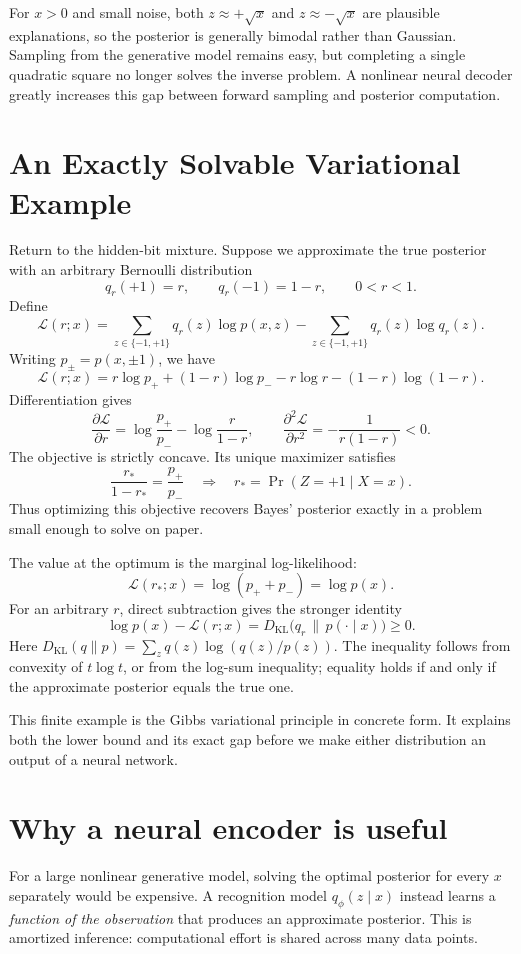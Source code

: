 For \(x>0\) and small noise, both \(z\approx+\sqrt x\) and \(z\approx-\sqrt x\) are plausible explanations, so the posterior is generally bimodal rather than Gaussian. Sampling from the generative model remains easy, but completing a single quadratic square no longer solves the inverse problem. A nonlinear neural decoder greatly increases this gap between forward sampling and posterior computation.

\section{An Exactly Solvable Variational Example}

Return to the hidden-bit mixture. Suppose we approximate the true posterior with an arbitrary Bernoulli distribution
\[
 q_r(+1)=r,\qquad q_r(-1)=1-r,\qquad 0<r<1.
\]
Define
\[
 \mathcal L(r;x)=
 \sum_{z\in\{-1,+1\}}q_r(z)\log p(x,z)
 -\sum_{z\in\{-1,+1\}}q_r(z)\log q_r(z).
\]
Writing \(p_\pm=p(x,\pm1)\), we have
\[
 \mathcal L(r;x)
 =r\log p_+ +(1-r)\log p_-
   -r\log r-(1-r)\log(1-r).
\]
Differentiation gives
\[
 \frac{\partial\mathcal L}{\partial r}
 =\log\frac{p_+}{p_-}-\log\frac r{1-r},\qquad
 \frac{\partial^2\mathcal L}{\partial r^2}
 =-\frac1{r(1-r)}<0.
\]
The objective is strictly concave. Its unique maximizer satisfies
\[
 \frac{r_*}{1-r_*}=\frac{p_+}{p_-}
 \quad\Longrightarrow\quad
 \boxed{r_*=\Pr(Z=+1\mid X=x).}
\]
Thus optimizing this objective recovers Bayes' posterior exactly in a problem small enough to solve on paper.

The value at the optimum is the marginal log-likelihood:
\[
 \mathcal L(r_*;x)=\log(p_++p_-)=\log p(x).
\]
For an arbitrary \(r\), direct subtraction gives the stronger identity
\[
 \boxed{\log p(x)-\mathcal L(r;x)
 =D_{\mathrm{KL}}\bigl(q_r\,\|\,p(\cdot\mid x)\bigr)\ge0.}
\]
Here \(D_{\mathrm{KL}}(q\|p)=\sum_zq(z)\log(q(z)/p(z))\). The inequality follows from convexity of \(t\log t\), or from the log-sum inequality; equality holds if and only if the approximate posterior equals the true one.

This finite example is the Gibbs variational principle in concrete form. It explains both the lower bound and its exact gap before we make either distribution an output of a neural network.

\section{Why a neural encoder is useful}

For a large nonlinear generative model, solving the optimal posterior for every \(x\) separately would be expensive. A recognition model \(q_\phi(z\mid x)\) instead learns a \emph{function of the observation} that produces an approximate posterior. This is amortized inference: computational effort is shared across many data points.

